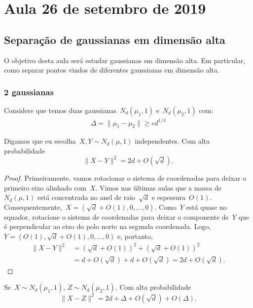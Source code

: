 \section{Aula 26 de setembro de 2019}
\label{2019_09_26}

\subsection{Separação de gaussianas em dimensão alta}

O objetivo desta aula será estudar gaussianas em dimensão alta. Em
particular, como separar pontos vindos de diferentes gaussianas em
dimensão alta.

\subsubsection{2 gaussianas}

Considere que temos duas gaussianas~$N_{d}(\mu_{1},1)$
e~$N_{d}(\mu_{2},1)$ com:
\begin{align*}
\Delta = \lVert \mu_{1} - \mu_{2} \rVert \geq cd^{1/4}
\end{align*}

\begin{fato}
  Digamos que eu escolha~$X,Y \sim N_{d}(\mu, 1)$ independentes. Com
  alta probabilidade~$$\lVert X - Y \rVert^2 = 2d + O(\sqrt{d}).$$
\end{fato}

\begin{proof}
  Primeiramente, vamos rotacionar o sistema de coordenadas para deixar
  o primeiro eixo alinhado com~$X$. Vimos nas últimas aulas que a
  massa de~$N_{d}(\mu, 1)$ está concentrada no anel de raio~$\sqrt{d}$
  e espessura~$O(1)$.
  Consequentemente,~$X=(\sqrt{d} + O(1),0,\dots,0)$. Como~$Y$ está
  quase no equador, rotacione o sistema de coordenadas para deixar o
  componente de~$Y$ que é perpendicular ao eixo do polo norte na
  segunda coordenada. Logo,~$Y=(O(1),\sqrt{d}+O(1),0,\dots,0)$ e,
  portanto,
  \begin{align*}
    \lVert X-Y \rVert^2 &= (\sqrt{d}+O(1))^{2} + (\sqrt{d}+O(1))^{2}\\
                        &= d + O(\sqrt{d}) + d + O(\sqrt{d}) = 2d + O(\sqrt{d}).
  \end{align*}
\end{proof}

\begin{fato}
  Se~$X \sim N_{d}(\mu_{1},1)$, $Z \sim N_{d}(\mu_{2},1)$. Com alta
  probabilidade~$$\lVert X - Z \rVert^{2} = 2d + \Delta + O(\sqrt{d}) + O(\Delta).$$
\end{fato}

